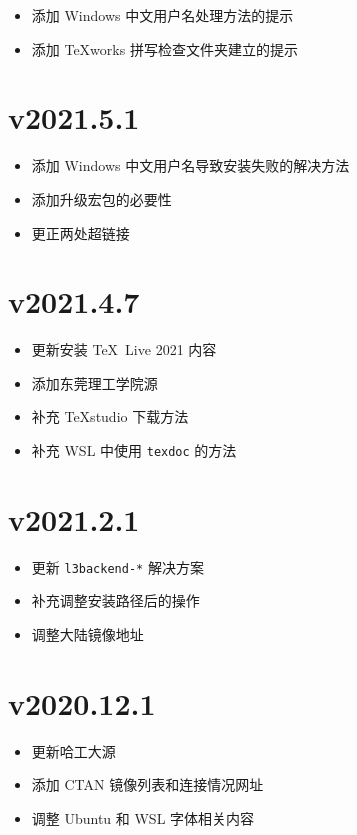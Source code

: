 \begin{itemize}
  \item 添加 Windows 中文用户名处理方法的提示
  \item 添加 \TeX works 拼写检查文件夹建立的提示
\end{itemize}

\section*{v2021.5.1}

\begin{itemize}
  \item 添加 Windows 中文用户名导致安装失败的解决方法
  \item 添加升级宏包的必要性
  \item 更正两处超链接
\end{itemize}

\section*{v2021.4.7}

\begin{itemize}
  \item 更新安装 \TeX\ Live 2021 内容
  \item 添加东莞理工学院源
  \item 补充 \TeX studio 下载方法
  \item 补充 WSL 中使用 \texttt{texdoc} 的方法
\end{itemize}

\section*{v2021.2.1}

\begin{itemize}
  \item 更新 \texttt{l3backend-*} 解决方案
  \item 补充调整安装路径后的操作
  \item 调整大陆镜像地址
\end{itemize}
\section*{v2020.12.1}

\begin{itemize}
  \item 更新哈工大源
  \item 添加 CTAN 镜像列表和连接情况网址
  \item 调整 Ubuntu 和 WSL 字体相关内容
\end{itemize}

